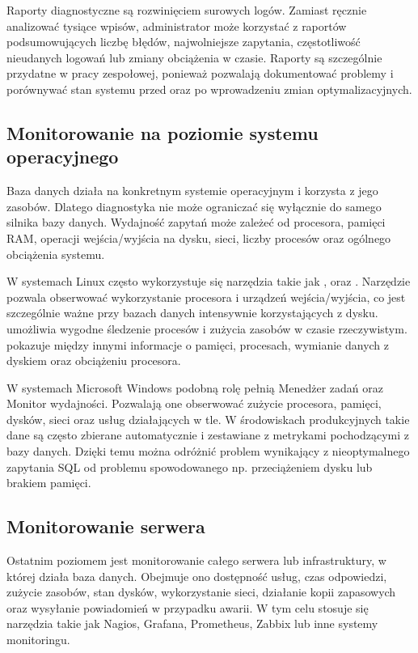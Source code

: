 \documentclass[letterpaper,10pt,polish]{sphinxmanual}
\begin{document}
\sphinxAtStartPar
Raporty diagnostyczne są rozwinięciem surowych logów. Zamiast ręcznie analizować tysiące wpisów, administrator może korzystać z raportów podsumowujących liczbę błędów, najwolniejsze zapytania, częstotliwość nieudanych logowań lub zmiany obciążenia w czasie. Raporty są szczególnie przydatne w pracy zespołowej, ponieważ pozwalają dokumentować problemy i porównywać stan systemu przed oraz po wprowadzeniu zmian optymalizacyjnych.


\subsection{Monitorowanie na poziomie systemu operacyjnego}
\label{\detokenize{rozdzia_u0142_2/rozdzia_u0142_24/index:monitorowanie-na-poziomie-systemu-operacyjnego}}
\sphinxAtStartPar
Baza danych działa na konkretnym systemie operacyjnym i korzysta z jego zasobów. Dlatego diagnostyka nie może ograniczać się wyłącznie do samego silnika bazy danych. Wydajność zapytań może zależeć od procesora, pamięci RAM, operacji wejścia/wyjścia na dysku, sieci, liczby procesów oraz ogólnego obciążenia systemu.

\sphinxAtStartPar
W systemach Linux często wykorzystuje się narzędzia takie jak ,  oraz . Narzędzie  pozwala obserwować wykorzystanie procesora i urządzeń wejścia/wyjścia, co jest szczególnie ważne przy bazach danych intensywnie korzystających z dysku.  umożliwia wygodne śledzenie procesów i zużycia zasobów w czasie rzeczywistym.  pokazuje między innymi informacje o pamięci, procesach, wymianie danych z dyskiem oraz obciążeniu procesora.

\sphinxAtStartPar
W systemach Microsoft Windows podobną rolę pełnią Menedżer zadań oraz Monitor wydajności. Pozwalają one obserwować zużycie procesora, pamięci, dysków, sieci oraz usług działających w tle. W środowiskach produkcyjnych takie dane są często zbierane automatycznie i zestawiane z metrykami pochodzącymi z bazy danych. Dzięki temu można odróżnić problem wynikający z nieoptymalnego zapytania SQL od problemu spowodowanego np. przeciążeniem dysku lub brakiem pamięci.


\subsection{Monitorowanie serwera}
\label{\detokenize{rozdzia_u0142_2/rozdzia_u0142_24/index:monitorowanie-serwera}}
\sphinxAtStartPar
Ostatnim poziomem jest monitorowanie całego serwera lub infrastruktury, w której działa baza danych. Obejmuje ono dostępność usług, czas odpowiedzi, zużycie zasobów, stan dysków, wykorzystanie sieci, działanie kopii zapasowych oraz wysyłanie powiadomień w przypadku awarii. W tym celu stosuje się narzędzia takie jak Nagios, Grafana, Prometheus, Zabbix lub inne systemy monitoringu.
\end{document}
